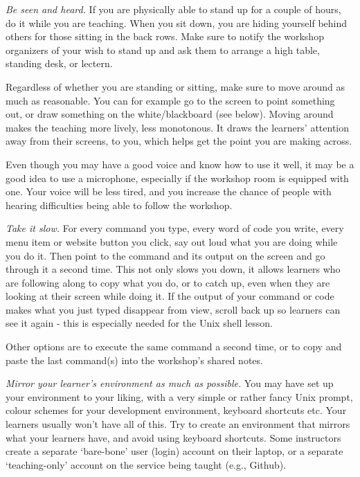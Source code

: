 \begin{genumerate}

\item
  \emph{Be seen and heard.}  If you are physically able to stand up
  for a couple of hours, do it while you are teaching. When you sit
  down, you are hiding yourself behind others for those sitting in the
  back rows. Make sure to notify the workshop organizers of your wish
  to stand up and ask them to arrange a high table, standing desk, or
  lectern.

  Regardless of whether you are standing or sitting, make sure to move
  around as much as reasonable. You can for example go to the screen
  to point something out, or draw something on the white/blackboard
  (see below). Moving around makes the teaching more lively, less
  monotonous.  It draws the learners' attention away from their
  screens, to you, which helps get the point you are making across.

  Even though you may have a good voice and know how to use it well,
  it may be a good idea to use a microphone, especially if the
  workshop room is equipped with one. Your voice will be less tired,
  and you increase the chance of people with hearing difficulties
  being able to follow the workshop.

\item
  \emph{Take it slow.}  For every command you type, every word of code
  you write, every menu item or website button you click, say out loud
  what you are doing while you do it. Then point to the command and
  its output on the screen and go through it a second time. This not
  only slows you down, it allows learners who are following along to
  copy what you do, or to catch up, even when they are looking at
  their screen while doing it. If the output of your command or code
  makes what you just typed disappear from view, scroll back up so
  learners can see it again - this is especially needed for the Unix
  shell lesson.

  Other options are to execute the same command a second time, or to
  copy and paste the last command(s) into the workshop's shared notes.

\item
  \emph{Mirror your learner's environment as much as possible.}  You
  may have set up your environment to your liking, with a very simple
  or rather fancy Unix prompt, colour schemes for your development
  environment, keyboard shortcuts etc. Your learners usually won't
  have all of this. Try to create an environment that mirrors what
  your learners have, and avoid using keyboard shortcuts. Some
  instructors create a separate `bare-bone' user (login) account on
  their laptop, or a separate `teaching-only' account on the service
  being taught (e.g., Github).


\end{genumerate}
